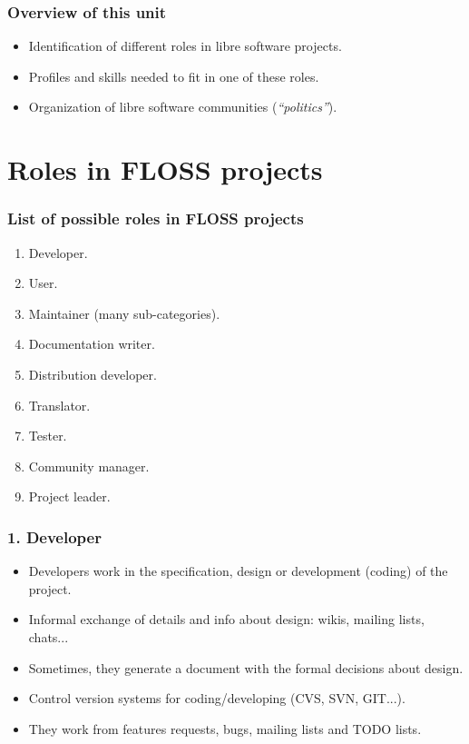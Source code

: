 \documentclass{beamer}
\begin{document}
\begin{frame}
\frametitle{Overview of this unit}
\begin{itemize}
\item Identification of different roles in libre software projects.
\item Profiles and skills needed to fit in one of these roles.
\item Organization of libre software communities (\textit{``politics''}).
\end{itemize}
\end{frame}


\section{Roles in FLOSS projects}


\begin{frame}
\frametitle{List of possible roles in FLOSS projects}
\begin{enumerate}
 \item Developer.
 \item User.
 \item Maintainer (many sub-categories).
 \item Documentation writer.
 \item Distribution developer.
 \item Translator.
 \item Tester.
 \item Community manager.
 \item Project leader.
\end{enumerate}

\end{frame}


\begin{frame}
 \frametitle{1. Developer}
 \begin{itemize}
  \item Developers work in the specification, design or development 
  (coding) of the project.
  \item Informal exchange of details and info about design: wikis, mailing lists, chats...
  \item Sometimes, they generate a document with the formal decisions about design.
  \item Control version systems for coding/developing (CVS, SVN, GIT...).
  \item They work from features requests, bugs, mailing lists and TODO lists.
 \end{itemize}

\end{frame}
\end{document}
